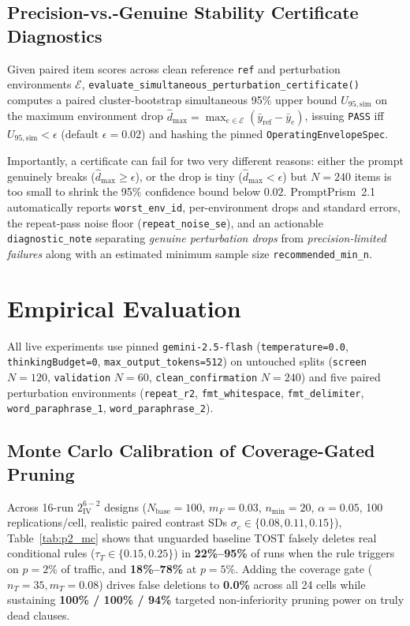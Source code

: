 \documentclass[11pt,a4paper]{article}
\newcommand{\method}{PromptPrism}
\begin{document}
\subsection{Precision-vs.-Genuine Stability Certificate Diagnostics}
Given paired item scores across clean reference \texttt{ref} and perturbation environments $\mathcal{E}$, \texttt{evaluate\_\allowbreak simultaneous\_\allowbreak perturbation\_\allowbreak certificate()} computes a paired cluster-bootstrap simultaneous 95\% upper bound $U_{95,\mathrm{sim}}$ on the maximum environment drop $\hat{d}_{\max} = \max_{e \in \mathcal{E}}(\bar{y}_{\mathrm{ref}} - \bar{y}_e)$, issuing \texttt{PASS} iff $U_{95,\mathrm{sim}} < \epsilon$ (default $\epsilon = 0.02$) and hashing the pinned \texttt{OperatingEnvelopeSpec}.

Importantly, a certificate can fail for two very different reasons: either the prompt genuinely breaks ($\hat{d}_{\max} \ge \epsilon$), or the drop is tiny ($\hat{d}_{\max} < \epsilon$) but $N=240$ items is too small to shrink the 95\% confidence bound below $0.02$. \method{}~2.1 automatically reports \texttt{worst\_env\_id}, per-environment drops and standard errors, the repeat-pass noise floor (\texttt{repeat\_noise\_se}), and an actionable \texttt{diagnostic\_note} separating \emph{genuine perturbation drops} from \emph{precision-limited failures} along with an estimated minimum sample size \texttt{recommended\_min\_n}.

\section{Empirical Evaluation}
\label{sec:results}
All live experiments use pinned \texttt{gemini-2.5-flash} (\texttt{temperature=0.0}, \texttt{thinkingBudget=0}, \texttt{max\_output\_tokens=512}) on untouched splits (\texttt{screen} $N=120$, \texttt{validation} $N=60$, \texttt{clean\_confirmation} $N=240$) and five paired perturbation environments (\texttt{repeat\_r2}, \texttt{fmt\_whitespace}, \texttt{fmt\_delimiter}, \texttt{word\_paraphrase\_1}, \texttt{word\_paraphrase\_2}).

\subsection{Monte Carlo Calibration of Coverage-Gated Pruning}
Across 16-run $2^{6-2}_{\mathrm{IV}}$ designs ($N_{\mathrm{base}}=100$, $m_F=0.03$, $n_{\min}=20$, $\alpha=0.05$, 100 replications/cell, realistic paired contrast SDs $\sigma_c \in \{0.08, 0.11, 0.15\}$), Table~\ref{tab:p2_mc} shows that unguarded baseline TOST falsely deletes real conditional rules ($\tau_T \in \{0.15, 0.25\}$) in \textbf{22\%--95\%} of runs when the rule triggers on $p=2\%$ of traffic, and \textbf{18\%--78\%} at $p=5\%$. Adding the coverage gate ($n_T=35, m_T=0.08$) drives false deletions to \textbf{0.0\%} across all 24 cells while sustaining \textbf{100\% / 100\% / 94\%} targeted non-inferiority pruning power on truly dead clauses.
\end{document}
